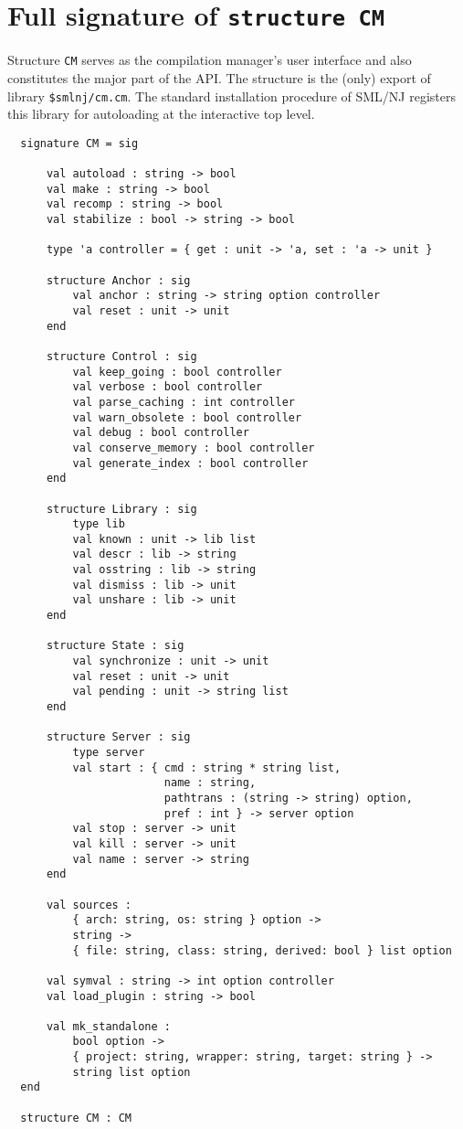 
\section{Full signature of {\tt structure CM}}

Structure {\tt CM} serves as the compilation manager's user interface
and also constitutes the major part of the API.  The structure is the
(only) export of library {\tt \$smlnj/cm.cm}.  The standard
installation procedure of SML/NJ registers this library for
autoloading at the interactive top level.

\begin{lstlisting}
  signature CM = sig

      val autoload : string -> bool
      val make : string -> bool
      val recomp : string -> bool
      val stabilize : bool -> string -> bool

      type 'a controller = { get : unit -> 'a, set : 'a -> unit }

      structure Anchor : sig
          val anchor : string -> string option controller
          val reset : unit -> unit
      end

      structure Control : sig
          val keep_going : bool controller
          val verbose : bool controller
          val parse_caching : int controller
          val warn_obsolete : bool controller
          val debug : bool controller
          val conserve_memory : bool controller
          val generate_index : bool controller
      end

      structure Library : sig
          type lib
          val known : unit -> lib list
          val descr : lib -> string
          val osstring : lib -> string
          val dismiss : lib -> unit
          val unshare : lib -> unit
      end

      structure State : sig
          val synchronize : unit -> unit
          val reset : unit -> unit
          val pending : unit -> string list
      end

      structure Server : sig
          type server
          val start : { cmd : string * string list,
                        name : string,
                        pathtrans : (string -> string) option,
                        pref : int } -> server option
          val stop : server -> unit
          val kill : server -> unit
          val name : server -> string
      end

      val sources :
          { arch: string, os: string } option ->
          string ->
          { file: string, class: string, derived: bool } list option

      val symval : string -> int option controller
      val load_plugin : string -> bool

      val mk_standalone :
          bool option ->
          { project: string, wrapper: string, target: string } ->
          string list option
  end

  structure CM : CM
\end{lstlisting}%
